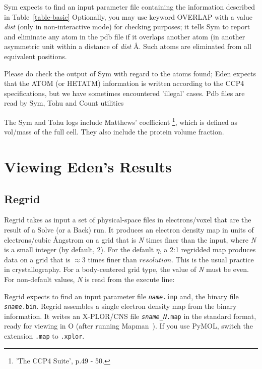 \documentclass{report}
\begin{document}
{\vspace {0.1in}

Sym expects to find an input parameter file 
containing the information described in Table~\ref{table-basic} 
Optionally, you may use keyword OVERLAP
 with a value {\it dist} 
(only in non-interactive mode) for checking purposes; it tells
Sym to report and eliminate any atom in the pdb file if it overlaps another
atom (in another asymmetric unit within a distance of {\it dist} \AA .
Such atoms are eliminated from all equivalent positions.  

\vspace {0.1in}

Please do check the output of Sym with regard to the atoms found; Eden expects
that the ATOM (or HETATM) information is written according to the CCP4
specifications, but we have sometimes encountered 'illegal' cases.
Pdb files are read by Sym, Tohu 
and Count utilities

The Sym and Tohu logs include Matthews' coefficient 
\footnote{ 'The CCP4 Suite', p.49 - 50.},  
which is defined as vol/mass of the full cell.
They also include the protein volume fraction.


\chapter {Viewing Eden's Results}
\label{postprocessors}

\section {Regrid}
\label{postprocessors-regrid}

Regrid takes as input a set of physical-space files in electrons/voxel that 
are the result of a Solve (or a Back) run.  It
produces an electron density map in units of electrons/cubic \AA ngstrom
on a grid that is {\it N} times finer than the input, 
where {\it N} is a small integer (by default, 2).
For the default $\eta$, a 2:1 regridded map produces data 
on a grid that is $\approx 3$ times finer than $resolution$.  
This is the usual practice in crystallography.
For a body-centered grid type, the value of {\it N} must be even. 
For non-default values, {\it N} is read from the execute line:


Regrid expects to find an input parameter file {\tt {\it name}.inp} and, 
the binary file {\tt {\it sname}.bin}.  Regrid assembles a single
electron density map from the binary information. 
It writes an X-PLOR/CNS file {\tt {\it sname\_N}.map} in the standard 
format, ready for viewing in O (after running Mapman~\cite{kleywegt}).
If you use PyMOL, switch the extension {\tt  .map} to {\tt .xplor}.

}
\end{document}
